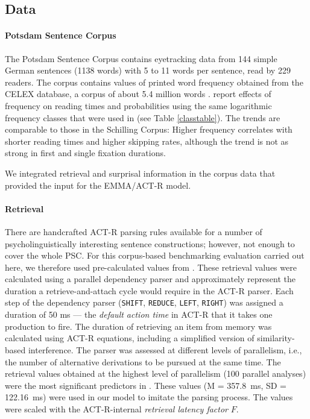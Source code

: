 \subsection{Data}
\paragraph{Potsdam Sentence Corpus}
The Potsdam Sentence Corpus contains eyetracking data from 144 simple German sentences (1138 words) with 5 to 11 words per sentence, read by 229 readers. 
The corpus contains values of printed word frequency obtained from the  CELEX database, a corpus of about 5.4 million words \citep{Baayen1993}.
\cite{Kliegl2004} report effects of frequency on reading times and probabilities using the same logarithmic frequency classes that were used in \cite{Salvucci2001} (see Table \ref{classtable}). The trends are comparable to those in the  Schilling Corpus: Higher frequency correlates with shorter reading times and higher skipping rates, although the trend is not as strong in first and single fixation durations. 

We integrated retrieval and surprisal information in the corpus data that provided the input for the EMMA/ACT-R model.

\paragraph{Retrieval}
There are handcrafted ACT-R parsing rules available for a number of psycholinguistically interesting sentence constructions;  however, not enough to cover the whole PSC.  For this corpus-based benchmarking evaluation carried out here, we therefore used pre-calculated values from \cite{BostonHaleVasishth2011}.  These retrieval values were calculated using a parallel dependency parser and approximately represent the duration a retrieve-and-attach cycle would require in the ACT-R parser.  Each step of the dependency parser (\texttt{SHIFT}, \texttt{REDUCE}, \texttt{LEFT}, \texttt{RIGHT}) was assigned a duration of 50 ms --- the \emph{default action time} in ACT-R that it takes one production to fire.  The duration of retrieving an item from memory was calculated using ACT-R equations, including a simplified version of similarity-based interference.  The parser was assessed at different levels of parallelism, i.e., the number of alternative derivations to be pursued at the same time.
The retrieval values obtained at the highest level of parallelism (100 parallel analyses) were the most significant predictors in \cite{BostonHaleVasishth2011}.  These values (M = 357.8~ms, SD = 122.16~ms) were used in our model to imitate the parsing process.  The values were scaled with the ACT-R-internal  \emph{retrieval latency factor} $F$.

